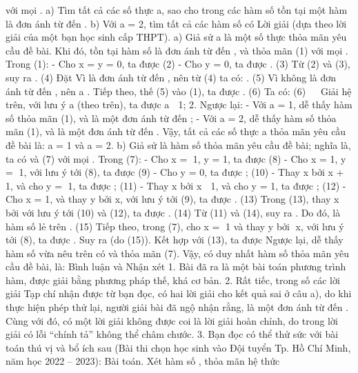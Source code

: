 \begin{multicols}{2}
	với mọi  .
	a) Tìm tất cả các số thực a, sao cho trong các hàm số   tồn tại một hàm là đơn ánh từ   đến  .
	b) Với a = 2, tìm tất cả các hàm số   có  
	Lời giải (dựa theo lời giải của một bạn học sinh cấp THPT).
	a) Giả sử a là một số thực thỏa mãn yêu cầu đề bài. Khi đó, tồn tại hàm số   là đơn ánh từ   đến  , và thỏa mãn
	(1)
	với mọi  .
	Trong (1):
	- Cho x = y = 0, ta được
	(2)
	- Cho y = 0, ta được
	.                                            (3)
	Từ (2) và (3), suy ra
	.                                             (4)
	Đặt   Vì   là đơn ánh từ   đến  , nên từ (4) ta có:
	.                                                       (5)
	Vì   không là đơn ánh từ   đến  , nên a .
	Tiếp theo, thế (5) vào (1), ta được
	.                    (6)
	Ta có:
	(6)        
	   
	Giải hệ trên, với lưu ý a  (theo trên), ta được a  {1; 2}.
	Ngược lại:
	- Với a = 1, dễ thấy hàm số   thỏa mãn (1), và là một đơn ánh từ   đến  ;
	- Với a = 2, dễ thấy hàm số   thỏa mãn (1), và là một đơn ánh từ   đến  .
	Vậy, tất cả các số thực a thỏa mãn yêu cầu đề bài là: a = 1 và a = 2.
	b) Giả sử   là hàm số thỏa mãn yêu cầu đề bài; nghĩa là, ta có   và
	(7)
	với mọi  .
	Trong (7):
	- Cho x = 1, y = 1, ta được                                                                                                 (8)
	- Cho x = 1, y = 1, với lưu ý tới (8), ta được                                                                         (9)
	- Cho y = 0, ta được
	;                                                    (10)
	- Thay x bởi x + 1, và cho y = 1, ta được
	;                               (11)
	- Thay x bởi x  1, và cho y = 1, ta được
	;                                                 (12)
	- Cho x = 1, và thay y bởi x, với lưu ý tới (9), ta được
	.                                         (13)
	Trong (13), thay x bởi   với lưu ý tới (10) và (12), ta được
	.                                                 (14)
	Từ (11) và (14), suy ra
	.
	Do đó,   là hàm số lẻ trên  .                                                                                                             (15)
	Tiếp theo, trong (7), cho x = 1 và thay y bởi x, với lưu ý tới (8), ta được
	.
	Suy ra
	(do (15)).
	Kết hợp với (13), ta được  
	Ngược lại, dễ thấy hàm số vừa nêu trên có   và thỏa mãn (7).
	Vậy, có duy nhất hàm số thỏa mãn yêu cầu đề bài, là:  
	Bình luận và Nhận xét
	1. Bài đã ra là một bài toán phương trình hàm, được giải bằng phương pháp thế, khá cơ bản.
	2. Rất tiếc, trong số các lời giải Tạp chí nhận được từ bạn đọc, có hai lời giải cho kết quả sai ở câu a), do khi thực hiện phép thử lại, người giải bài đã ngộ nhận rằng,   là một đơn ánh từ   đến  . Cùng với đó, có một lời giải không được coi là lời giải hoàn chỉnh, do trong lời giải có lỗi “chính tả” không thể châm chước.
	3. Bạn đọc có thể thử sức với bài toán thú vị và bổ ích sau (Bài thi chọn học sinh vào Đội tuyển Tp. Hồ Chí Minh, năm học 2022 – 2023):
	Bài toán. Xét hàm số  , thỏa mãn hệ thức
	

\end{multicols}
